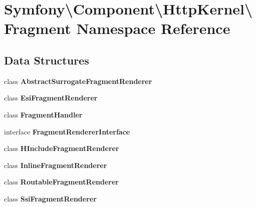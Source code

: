 \section{Symfony\textbackslash{}Component\textbackslash{}Http\+Kernel\textbackslash{}Fragment Namespace Reference}
\label{namespace_symfony_1_1_component_1_1_http_kernel_1_1_fragment}
\subsection*{Data Structures}
\begin{DoxyCompactItemize}
\item 
class {\bf Abstract\+Surrogate\+Fragment\+Renderer}
\item 
class {\bf Esi\+Fragment\+Renderer}
\item 
class {\bf Fragment\+Handler}
\item 
interface {\bf Fragment\+Renderer\+Interface}
\item 
class {\bf H\+Include\+Fragment\+Renderer}
\item 
class {\bf Inline\+Fragment\+Renderer}
\item 
class {\bf Routable\+Fragment\+Renderer}
\item 
class {\bf Ssi\+Fragment\+Renderer}
\end{DoxyCompactItemize}
